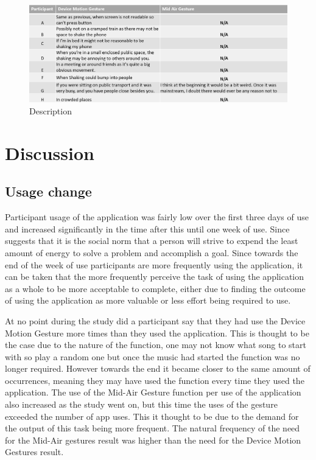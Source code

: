 \documentclass{l4proj}
\begin{document}
\begin{figure}[!htb]
    \centering
    \includegraphics[width=\textwidth]{images/problems.PNG}
        \caption{Description}
        \label{fig:problems}
\end{figure}



\section{Discussion} 

\subsection{Usage change}

Participant usage of the application was fairly low over the first three days of use and increased significantly in the time after this until one week of use. Since \citet{zipf_human_2016} suggests that it is the social norm that a person will strive to expend the least amount of energy to solve a problem and accomplish a goal. Since towards the end of the week of use participants are more frequently using the application, it can be taken that the more frequently perceive the task of using the application as a whole to be more acceptable to complete, either due to finding the outcome of using the application as more valuable or less effort being required to use. 

At no point during the study did a participant say that they had use the Device Motion Gesture more times than they used the application. This is thought to be the case due to the nature of the function, one may not know what song to start with so play a random one but once the music had started the function was no longer required. However towards the end it became closer to the same amount of occurrences, meaning they may have used the function every time they used the application. The use of the Mid-Air Gesture function per use of the application also increased as the study went on, but this time the uses of the gesture exceeded the number of app uses. This it thought to be due to the demand for the output of this task being more frequent. The natural frequency of the need for the Mid-Air gestures result was higher than the need for the Device Motion Gestures result.
\end{document}

